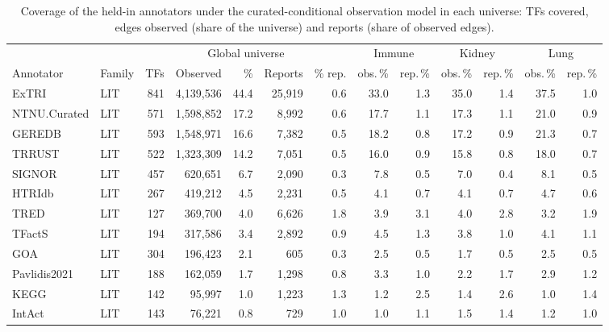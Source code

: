 \begin{table}[htbp]
\centering
\small
\setlength{\tabcolsep}{2.6pt}
\caption{Coverage of the held-in annotators under the curated-conditional observation model in each universe: TFs covered, edges observed (share of the universe) and reports (share of observed edges).}
\label{tab:S-annotator-coverage}
\begin{tabular}{@{}llrrrrrrrrrrr@{}}
\toprule
 & & \multicolumn{5}{c}{Global universe} & \multicolumn{2}{c}{Immune} & \multicolumn{2}{c}{Kidney} & \multicolumn{2}{c}{Lung} \\
\cmidrule(lr){3-7}\cmidrule(lr){8-9}\cmidrule(lr){10-11}\cmidrule(lr){12-13}
Annotator & Family & TFs & Observed & \% & Reports & \% rep. & obs.\,\% & rep.\,\% & obs.\,\% & rep.\,\% & obs.\,\% & rep.\,\% \\
\midrule
ExTRI & LIT & 841 & 4{,}139{,}536 & 44.4 & 25{,}919 & 0.6 & 33.0 & 1.3 & 35.0 & 1.4 & 37.5 & 1.0 \\
NTNU.Curated & LIT & 571 & 1{,}598{,}852 & 17.2 & 8{,}992 & 0.6 & 17.7 & 1.1 & 17.3 & 1.1 & 21.0 & 0.9 \\
GEREDB & LIT & 593 & 1{,}548{,}971 & 16.6 & 7{,}382 & 0.5 & 18.2 & 0.8 & 17.2 & 0.9 & 21.3 & 0.7 \\
TRRUST & LIT & 522 & 1{,}323{,}309 & 14.2 & 7{,}051 & 0.5 & 16.0 & 0.9 & 15.8 & 0.8 & 18.0 & 0.7 \\
SIGNOR & LIT & 457 & 620{,}651 & 6.7 & 2{,}090 & 0.3 & 7.8 & 0.5 & 7.0 & 0.4 & 8.1 & 0.5 \\
HTRIdb & LIT & 267 & 419{,}212 & 4.5 & 2{,}231 & 0.5 & 4.1 & 0.7 & 4.1 & 0.7 & 4.7 & 0.6 \\
TRED & LIT & 127 & 369{,}700 & 4.0 & 6{,}626 & 1.8 & 3.9 & 3.1 & 4.0 & 2.8 & 3.2 & 1.9 \\
TFactS & LIT & 194 & 317{,}586 & 3.4 & 2{,}892 & 0.9 & 4.5 & 1.3 & 3.8 & 1.0 & 4.1 & 1.1 \\
GOA & LIT & 304 & 196{,}423 & 2.1 & 605 & 0.3 & 2.5 & 0.5 & 1.7 & 0.5 & 2.5 & 0.5 \\
Pavlidis2021 & LIT & 188 & 162{,}059 & 1.7 & 1{,}298 & 0.8 & 3.3 & 1.0 & 2.2 & 1.7 & 2.9 & 1.2 \\
KEGG & LIT & 142 & 95{,}997 & 1.0 & 1{,}223 & 1.3 & 1.2 & 2.5 & 1.4 & 2.6 & 1.0 & 1.4 \\
IntAct & LIT & 143 & 76{,}221 & 0.8 & 729 & 1.0 & 1.0 & 1.1 & 1.5 & 1.4 & 1.2 & 1.0 \\

\end{tabular}
\end{table}
